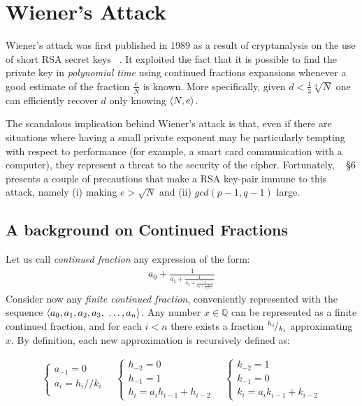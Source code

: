 \chapter{Wiener's Attack \label{chap:wiener}}

Wiener's attack was first published in 1989 as a result of cryptanalysis on the
use of short RSA secret keys ~\cite{wiener}. It exploited the fact that it is
possible to find the private key in \emph{polynomial time} using continued fractions
expansions whenever a good estimate of the fraction $\frac{e}{N}$ is known.
More specifically, given $d < \frac{1}{3} \sqrt[4]{N}$ one can efficiently
recover $d$ only knowing $\langle N, e\rangle$.

The scandalous implication behind Wiener's attack is that, even if there are
situations where having a small private exponent may be
particularly tempting with respect to performance (for example, a smart card
communication with a computer), they represent a threat to the security of the
cipher.
Fortunately, ~\cite{wiener} \S 6 presents a couple of precautions that make a
RSA key-pair immune to this attack, namely
(i) making $e > \sqrt{N}$ and
(ii) $gcd(p-1, q-1)$ large.

\section{A background on Continued Fractions \label{sec:wiener:cf}}

Let us call \emph{continued fraction} any expression of the form:
\begin{align*}
a_0 + \frac{1}{a_1
    + \frac{1}{a_2
    + \frac{1}{a_3
    + \frac{1}{a_4 + \ldots}}}}
\end{align*}
Consider now any \emph{finite continued fraction}, conveniently represented with
the sequence
$\angular{a_0, a_1, a_2, a_3,  \ \ldots, a_n}$.
Any number $x \in \mathbb{Q}$ can be represented as a finite continued fraction,
and for each $i < n$ there exists a fraction ${}^{h_i}\!/_{k_i}$ approximating
$x$.
By definition, each new approximation is recursively defined as:

\begin{align}
  \label{eq:wiener:cf}
  \begin{cases}
    a_{-1} = 0 \\
    a_i = h_i // k_i \\
  \end{cases}
  \quad
  \begin{cases}
    h_{-2} = 0 \\
    h_{-1} = 1 \\
    h_i = a_i h_{i-1} + h_{i-2}
  \end{cases}
  \quad
  \begin{cases}
    k_{-2} = 1 \\
    k_{-1} = 0  \\
    k_i = a_i k_{i-1} + k_{i-2}
  \end{cases}
\end{align}

